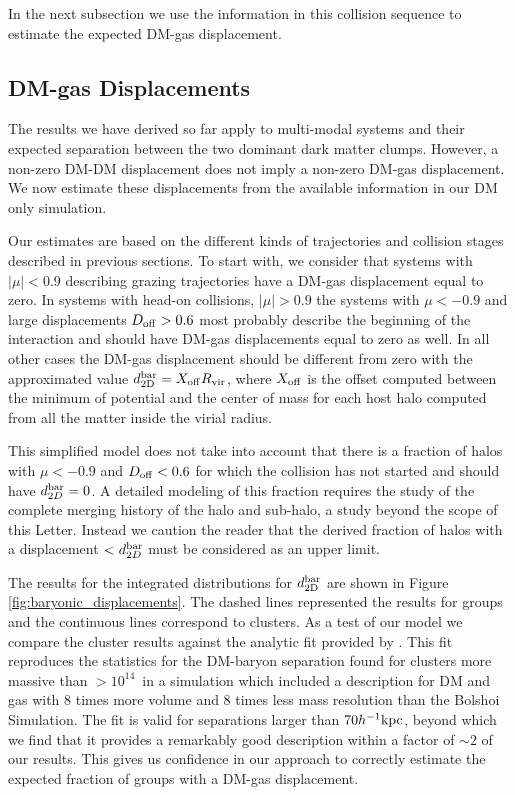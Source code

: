 \documentclass{emulateapj}
\newcommand{\hkpc}{{\ifmmode{h^{-1}{\rm kpc}}\else{$h^{-1}$kpc }\fi}}
\newcommand{\hMsun}{{\ifmmode{h^{-1}{\rm {M_{\odot}}}}\else{$h^{-1}{\rm{M_{\odot}}}$}\fi}}
\begin{document}
In the next subsection we use the information in this collision
sequence to estimate the expected DM-gas displacement. 

\subsection{DM-gas Displacements}
\label{sec:baryonic_displacements}

The results we have derived so far apply to multi-modal systems and
their expected separation between the two dominant dark matter
clumps. However, a non-zero DM-DM displacement does not imply 
a non-zero DM-gas displacement. We now estimate these displacements
from the available information in our DM only simulation.

Our estimates are based on the different kinds of trajectories and
collision stages described in previous sections. To start with, we
consider that systems with $|\mu|<0.9$ describing grazing
trajectories have a DM-gas displacement equal to zero.  In systems
with head-on collisions, $|\mu|>0.9$ the systems with $\mu<-0.9$ and
large displacements $D_{\rm   off}>0.6$ most probably describe the
beginning of the interaction and should have DM-gas displacements
equal to zero as well. In all other cases the DM-gas displacement
should be different from zero with the approximated value
$d_{\rm   2D}^{\rm bar} = X_{\rm off} R_{\rm   vir}$, where $X_{\rm   off}$ is
the offset computed between the minimum of potential and the center of
mass for each host halo computed from all the matter inside the virial
radius.   


This simplified model does not take into account that there is a
fraction of halos with $\mu<-0.9$ and $D_{\rm off}<0.6$ for which the
collision has not started and should have $d_{2D}^{\rm bar}=0$. A detailed
modeling of this fraction requires the study of the complete merging
history  of the halo and sub-halo, a study beyond the scope of this
Letter. Instead we caution the reader that the derived fraction of
halos with a displacement $<d_{2D}^{\rm bar}$ must be considered as an
upper limit. 

The results for the integrated distributions for $d_{\rm 2D}^{\rm bar}$
are shown in Figure \ref{fig:baryonic_displacements}. The dashed lines
represented the results for groups and the continuous lines correspond
to clusters. As a test of our model we compare the cluster results
against the analytic fit provided by \cite{ForeroRomero2010}. This fit
reproduces the statistics for the DM-baryon separation found for
clusters more massive than $>10^{14}$\hMsun\ in a simulation
which included a description for DM and gas with $8$ times more volume
and $8$ times less mass resolution than the Bolshoi Simulation. The
fit is valid for separations larger than $70\hkpc$, beyond which we
find that it provides a remarkably good description within a factor of
$\sim 2$ of our results. This gives us confidence in our approach to
correctly estimate the expected fraction of groups with a DM-gas
displacement. 
\end{document}
